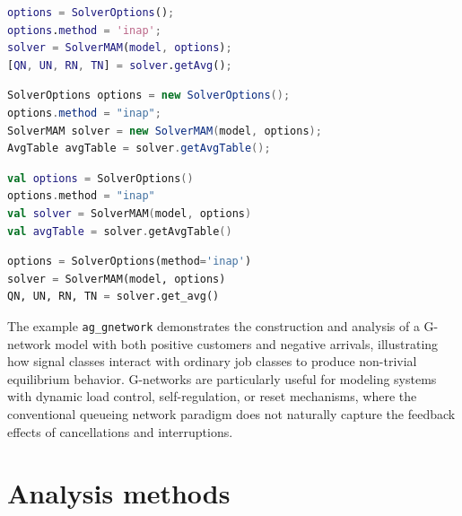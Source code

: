 \begin{MATLAB}
\begin{lstlisting}[language = matlab]
options = SolverOptions();
options.method = 'inap';
solver = SolverMAM(model, options);
[QN, UN, RN, TN] = solver.getAvg();
\end{lstlisting}
\end{MATLAB}
\begin{JAVA}
\begin{lstlisting}[language=java, basicstyle=\ttfamily\scriptsize]
SolverOptions options = new SolverOptions();
options.method = "inap";
SolverMAM solver = new SolverMAM(model, options);
AvgTable avgTable = solver.getAvgTable();
\end{lstlisting}
\end{JAVA}
\begin{KOTLIN}
\begin{lstlisting}[language=kotlin, basicstyle=\ttfamily\scriptsize]
val options = SolverOptions()
options.method = "inap"
val solver = SolverMAM(model, options)
val avgTable = solver.getAvgTable()
\end{lstlisting}
\end{KOTLIN}
\begin{PYTHON}
\begin{lstlisting}[language=python]
options = SolverOptions(method='inap')
solver = SolverMAM(model, options)
QN, UN, RN, TN = solver.get_avg()
\end{lstlisting}
\end{PYTHON}

The example \texttt{ag\_gnetwork} demonstrates the construction and analysis of a G-network model with both positive customers and negative arrivals, illustrating how signal classes interact with ordinary job classes to produce non-trivial equilibrium behavior. G-networks are particularly useful for modeling systems with dynamic load control, self-regulation, or reset mechanisms, where the conventional queueing network paradigm does not naturally capture the feedback effects of cancellations and interruptions.

\chapter{Analysis methods}
\label{analysis-methods}

